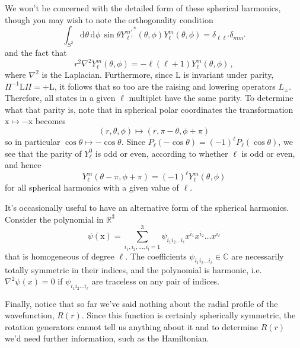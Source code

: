 \documentclass{article}
\theoremstyle{plain}\theoremheaderfont{\normalfont\itshape}\theorembodyfont{\rmfamily}\theoremseparator{.}\newtheorem*{rem}{Remark}\newtheorem*{ex}{Example}\newtheorem*{proof}{Proof}\newtheorem*{altp}{Alternative proof}
\theoremstyle{plain}\theoremheaderfont{\normalfont\bfseries}\theorembodyfont{\rmfamily}\theoremseparator{.}\newtheorem{thm}{Theorem}[section]\newtheorem{lem}[thm]{Lemma}\newtheorem{prop}[thm]{Proposition}\newtheorem*{cor}{Corollary}\newtheorem{defn}[thm]{Definition}\newtheorem{clm}[thm]{Claim}\newtheorem{clminproof}{Claim}
\theoremstyle{break}\theoremheaderfont{\normalfont\itshape}\theorembodyfont{\rmfamily}\theoremseparator{.\medskip}\newtheorem*{proofskip}{Proof}\newtheorem*{exs}{Examples}\newtheorem*{rems}{Remarks}
\theoremstyle{break}\theoremheaderfont{\normalfont\bfseries}\theorembodyfont{\rmfamily}\theoremseparator{.\medskip}\newtheorem{lemskip}[thm]{Lemma}\newtheorem{defnskip}[thm]{Definition}\newtheorem{propskip}[thm]{Proposition}\newtheorem{thmskip}[thm]{Theorem}
\numberwithin{equation}{section}
\newcommand{\dd}[2][]{\mathrm{d}^{#1} #2\,}
\newcommand{\vb}[1]{\bm{\mathrm{#1}}}
\newcommand{\laplacian}{\nabla^2}
\newcommand{\RR}{\mathbb{R}}
\newcommand{\CC}{\mathbb{C}}
\begin{document}
    We won't be concerned with the detailed form of these spherical harmonics, though you may wish to note the orthogonality condition
    \begin{equation}
        \int_{S^2}\dd{\theta}\dd{\phi}\sin\theta {Y_{\ell'}^{m'}}^*(\theta,\phi)Y_\ell^m(\theta,\phi)=\delta_{\ell \ell'}\delta_{m m'}
    \end{equation}
    and the fact that
    \begin{equation}
        r^2\laplacian Y_{\ell}^{m}(\theta,\phi)=-\ell(\ell+1)Y_{\ell}^{m}(\theta,\phi)\,,
    \end{equation}
    where \(\laplacian\) is the Laplacian. Furthermore, since \(\vb{L}\) is invariant under parity, \(\Pi^{-1}\vb{L}\Pi=+\vb{L}\), it follows that so too are the raising and lowering operators \(L_\pm\). Therefore, all states in a given \(\ell\) multiplet have the same parity. To determine what that parity is, note that in spherical polar coordinates the transformation \(\vb{x}\mapsto -\vb{x}\) becomes
    \begin{equation}
        (r,\theta,\phi)\mapsto(r,\pi-\theta,\phi+\pi)
    \end{equation}
    so in particular \(\cos\theta\mapsto -\cos\theta\). Since \(P_\ell(-\cos\theta)=(-1)^\ell P_\ell(\cos\theta)\), we see that the parity of \(Y_\ell^0\) is odd or even, according to whether \(\ell\) is odd or even, and hence
    \begin{equation}
        Y_\ell^m(\theta-\pi,\phi+\pi)=(-1)^\ell Y_\ell^m(\theta,\phi)
    \end{equation}
    for all spherical harmonics with a given value of \(\ell\).

    It's occasionally useful to have an alternative form of the spherical harmonics. Consider the polynomial in \(\RR^3\)
    \begin{equation}
        \psi(\vb{x})=\sum_{i_1,i_2,\dots,i_l=1}^{3}\psi_{i_1 i_2\dots i_\ell}x^{i_1}x^{i_2}\dots x^{i_\ell}
    \end{equation}
    that is homogeneous of degree \(\ell\). The coefficients \(\psi_{i_1 i_2\dots i_\ell}\in\CC\) are necessarily totally symmetric in their indices, and the polynomial is harmonic, i.e. \(\laplacian\psi(x)=0\) if \(\psi_{i_1 i_2 \dots i_\ell}\) are traceless on any pair of indices.

    Finally, notice that so far we've said nothing about the radial profile of the wavefunction, \(R(r)\). Since this function is certainly spherically symmetric, the rotation generators cannot tell us anything about it and to determine \(R(r)\) we'd need further information, such as the Hamiltonian.
    
\end{document}
